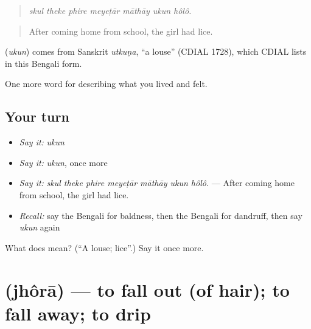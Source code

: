 \begin{quote}
      
\end{quote}

\begin{quote}
\emph{skul theke phire meyeṭār māthāy ukun hôlô.}
\end{quote}

\begin{quote}
After coming home from school, the girl had lice.
\end{quote}

\begin{cousinweb}
\textbf{} (\emph{ukun}) comes from Sanskrit \emph{utkuṇa}, \textquotedblleft{}a louse\textquotedblright{} (CDIAL 1728), which CDIAL lists in this Bengali form.
\end{cousinweb}

\begin{grammarlens}[title={What you've built}]
One more word for describing what you lived and felt.
\end{grammarlens}

\subsection*{Your turn}
\begin{itemize}
\raggedright
  \item \emph{Say it:} \emph{ukun}
  \item \emph{Say it:} \emph{ukun}, once more
  \item \emph{Say it:} \emph{skul theke phire meyeṭār māthāy ukun hôlô.} — After coming home from school, the girl had lice.
  \item \emph{Recall:} say the Bengali for baldness, then the Bengali for dandruff, then say \emph{ukun} again
\end{itemize}

\begin{tcolorbox}[breakable,colback=teal!4,colframe=teal!35!black,title={Before you move on}]
What does  mean? (\textquotedblleft{}A louse; lice\textquotedblright{}.) Say it once more.
\end{tcolorbox}
\section[\texorpdfstring{\bn{ঝরা} (jhôrā)}{ঝরা (jhôrā)}]{ (jhôrā) — to fall out (of hair); to fall away; to drip}

